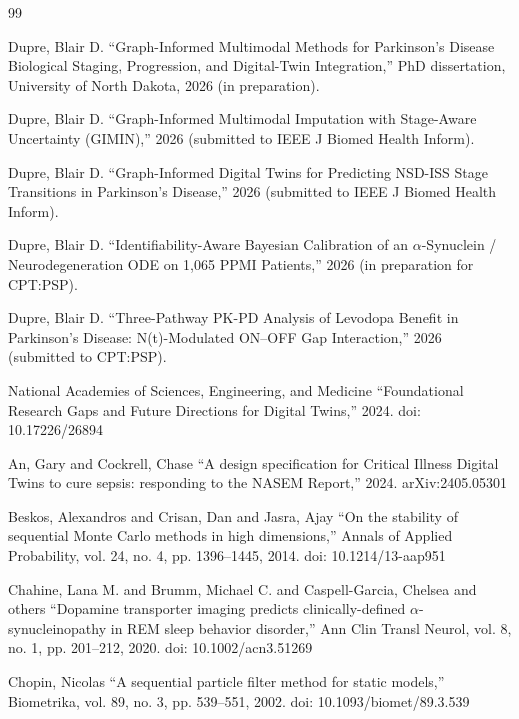 \begin{thebibliography}{99}

 Dupre, Blair D. ``Graph-Informed Multimodal Methods for Parkinson's Disease Biological Staging, Progression, and Digital-Twin Integration,'' PhD dissertation, University of North Dakota, 2026 (in preparation).

 Dupre, Blair D. ``Graph-Informed Multimodal Imputation with Stage-Aware Uncertainty (GIMIN),'' 2026 (submitted to IEEE J Biomed Health Inform).

 Dupre, Blair D. ``Graph-Informed Digital Twins for Predicting NSD-ISS Stage Transitions in Parkinson's Disease,'' 2026 (submitted to IEEE J Biomed Health Inform).

 Dupre, Blair D. ``Identifiability-Aware Bayesian Calibration of an $\alpha$-Synuclein / Neurodegeneration ODE on 1,065 PPMI Patients,'' 2026 (in preparation for CPT:PSP).

 Dupre, Blair D. ``Three-Pathway PK-PD Analysis of Levodopa Benefit in Parkinson's Disease: N(t)-Modulated ON--OFF Gap Interaction,'' 2026 (submitted to CPT:PSP).

 National Academies of Sciences, Engineering, and Medicine ``Foundational Research Gaps and Future Directions for Digital Twins,'' 2024. doi: 10.17226/26894

 An, Gary and Cockrell, Chase ``A design specification for Critical Illness Digital Twins to cure sepsis: responding to the NASEM Report,'' 2024. arXiv:2405.05301

 Beskos, Alexandros and Crisan, Dan and Jasra, Ajay ``On the stability of sequential Monte Carlo methods in high dimensions,'' Annals of Applied Probability, vol. 24, no. 4, pp. 1396--1445, 2014. doi: 10.1214/13-aap951

 Chahine, Lana M. and Brumm, Michael C. and Caspell-Garcia, Chelsea and others ``Dopamine transporter imaging predicts clinically-defined $\alpha$-synucleinopathy in REM sleep behavior disorder,'' Ann Clin Transl Neurol, vol. 8, no. 1, pp. 201--212, 2020. doi: 10.1002/acn3.51269

 Chopin, Nicolas ``A sequential particle filter method for static models,'' Biometrika, vol. 89, no. 3, pp. 539--551, 2002. doi: 10.1093/biomet/89.3.539


\end{thebibliography}
